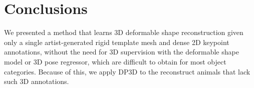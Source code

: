 \section{Conclusions}\label{s:conclusion}

We presented a method that learns 3D deformable shape reconstruction given only a single artist-generated rigid template mesh and dense 2D keypoint annotations,
without the need for 3D supervision with the deformable shape model or 3D pose regressor, which are difficult to obtain for most object categories.
Because of this, we apply DP3D to the reconstruct animals that lack such 3D annotations.